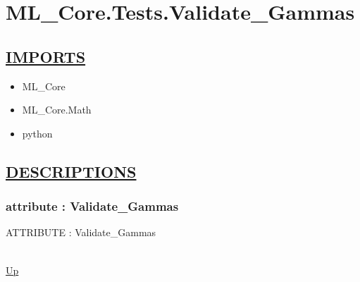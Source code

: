 \chapter*{ML\_Core.Tests.Validate\_Gammas}
\hypertarget{ML_Core.Tests.Validate_Gammas}{}

\section*{\underline{IMPORTS}}
\begin{itemize}
\item ML\_Core
\item ML\_Core.Math
\item python
\end{itemize}

\section*{\underline{DESCRIPTIONS}}
\subsection*{attribute : Validate\_Gammas}
\hypertarget{ecldoc:ml_core.tests.validate_gammas}{ATTRIBUTE : Validate\_Gammas} \\
\hyperlink{ecldoc:}{Up} \\
\par
